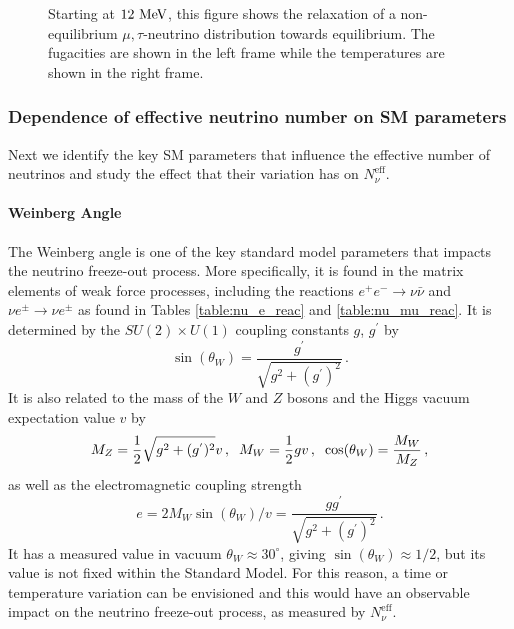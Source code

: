 \begin{figure} 
\begin{minipage}{\linewidth}
\end{minipage}
\caption{Starting at $12\text{ MeV}$, this figure shows the relaxation of a non-equilibrium $\mu,\tau$-neutrino distribution towards equilibrium. The fugacities are shown in the left frame while the temperatures are shown in the right frame.\label{fig:relax}}
 \end{figure}







\subsubsection{Dependence of effective neutrino number on SM parameters}\label{sec:param_char}

Next we identify the key SM parameters that influence the effective number of neutrinos and study the effect that  their variation has on $N_\nu^{\mathrm{eff}}$.


\paragraph{Weinberg Angle}

The Weinberg angle is one of the key standard model parameters that impacts the neutrino freeze-out process.  More specifically, it is found in the matrix elements of weak force processes, including the reactions $e^+e^-\rightarrow \nu\bar\nu$ and $\nu e^\pm\rightarrow \nu e^\pm$ as found in Tables \ref{table:nu_e_reac} and \ref{table:nu_mu_reac}.  It is determined by the $SU(2)\times U(1)$ coupling constants $g$, $g^{'}$  by
\begin{equation}
\sin(\theta_W)=\frac{g^{'}}{\sqrt{g^2+(g^{'})^2}}\,.
\end{equation}
It is also related to the mass of the $W$ and $Z$ bosons and the Higgs vacuum expectation value $v$ by
\begin{equation}
M_Z=\frac{1}{2}\sqrt{g^2+(g^{'})^2}v\,,\hspace{2mm}  M_W=\frac{1}{2}gv\,,\hspace{2mm} \cos(\theta_W)=\frac{M_W}{M_Z}\,,
\end{equation}
as well as the electromagnetic coupling strength
\begin{equation}
e=2M_W\sin(\theta_W)/v=\frac{gg^{'}}{\sqrt{g^2+(g^{'})^2}}\,.
\end{equation}
It has a measured value in vacuum $\theta_W\approx 30^\circ$, giving $\sin(\theta_W)\approx 1/2$, but its value is not fixed within the Standard Model. For this reason, a time or temperature variation can be envisioned and this would have an observable impact on the neutrino freeze-out process, as measured by $N_\nu^{\mathrm{eff}}$.

